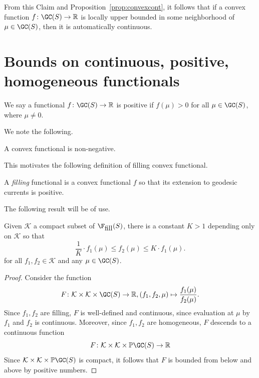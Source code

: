 From this Claim and Proposition~\ref{prop:convexcont}, it follows that if a convex function $f \colon \GC(S) \to \mathbb{R}$ is locally upper bounded in some neighborhood of $\mu \in \GC(S)$, then it is automatically continuous.


\section{Bounds on continuous, positive, homogeneous functionals}

\begin{definition}[Positive]
  We say a functional $f \colon \GC(S) \to \mathbb{R}$ is positive if $f(\mu)>0$ for all $\mu \in \GC(S)$, where $\mu \neq 0$.
\end{definition}

We note the following.

\begin{proposition}
A convex functional is non-negative.
\end{proposition}

This motivates the following definition of filling convex functional.

\begin{definition}
A \emph{filling} functional is a convex functional $f$ so that its extension to geodesic currents is positive.
\end{definition}

The following result will be of use.

\begin{theorem}
Given $\mathcal{K}$ a compact subset of $\F_{\mbox{fill}}(S)$, there is a constant $K>1$ depending only on $\mathcal{K}$ so that
\[
\frac{1}{K}\cdot f_1(\mu) \leq f_2(\mu) \leq K \cdot f_1(\mu).
\]
for all $f_1,f_2 \in \mathcal{K}$ and any $\mu \in \GC(S)$.
\label{thm:lipfillfunc}
\end{theorem}
\begin{proof}
Consider the function
\[
F \colon \mathcal{K} \times \mathcal{K} \times \GC(S) \to \mathbb{R}, (f_1,f_2,\mu) \mapsto \frac{f_1(\mu)}{f_2(\mu)}.
\]
Since $f_1,f_2$ are filling, $F$ is well-defined and continuous, since evaluation at $\mu$ by $f_1$ and $f_2$ is continuous.
Moreover, since $f_1,f_2$ are homogeneous, $F$ descends to a continuous function
\[
F \colon \mathcal{K} \times \mathcal{K} \times \mathbb{P}\GC(S) \to \mathbb{R}
\]
Since $\mathcal{K} \times \mathcal{K} \times \mathbb{P}\GC(S)$ is compact, it follows that $F$ is bounded from below and above by positive numbers.
\end{proof}

